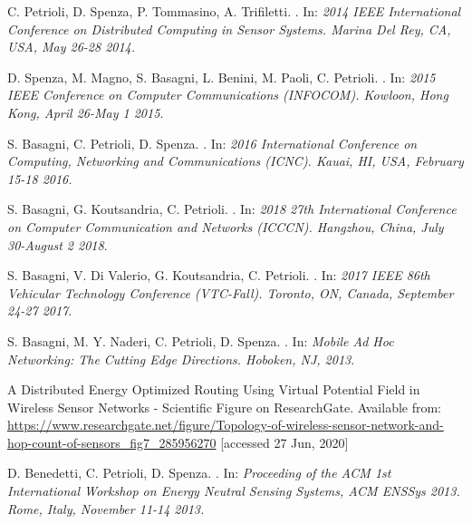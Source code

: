 \documentclass[binding=0.6cm,TFA]{sapthesis}
\begin{document}
\begin{thebibliography}{9}

    C. Petrioli, D. Spenza, P. Tommasino, A. Trifiletti.
    .
    In: \textit{2014 IEEE International Conference on Distributed Computing in Sensor Systems. Marina Del Rey, CA, USA, May 26-28 2014.}

    D. Spenza, M. Magno, S. Basagni, L. Benini, M. Paoli, C. Petrioli.
    .
    In: \textit{2015 IEEE Conference on Computer Communications (INFOCOM). Kowloon, Hong Kong, April 26-May 1 2015.}

    S. Basagni, C. Petrioli, D. Spenza.
    .
    In: \textit{2016 International Conference on Computing, Networking and Communications (ICNC). Kauai, HI, USA, February 15-18 2016.}

    S. Basagni, G. Koutsandria, C. Petrioli.
    .
    In: \textit{2018 27th International Conference on Computer Communication and Networks (ICCCN). Hangzhou, China, July 30-August 2 2018}.

    S. Basagni, V. Di Valerio, G. Koutsandria, C. Petrioli.
    .
    In: \textit{2017 IEEE 86th Vehicular Technology Conference (VTC-Fall). Toronto, ON, Canada, September 24-27 2017}.

    S. Basagni, M. Y. Naderi, C. Petrioli, D. Spenza.
    .
    In: \textit{Mobile Ad Hoc Networking: The Cutting Edge Directions. Hoboken, NJ, 2013}.

    \newpage        %

    A Distributed Energy Optimized Routing Using Virtual Potential Field in Wireless Sensor Networks - Scientific Figure on ResearchGate.
    Available from: \url{https://www.researchgate.net/figure/Topology-of-wireless-sensor-network-and-hop-count-of-sensors_fig7_285956270} [accessed 27 Jun, 2020]

    D. Benedetti, C. Petrioli, D. Spenza.
    .
    In: \textit{Proceeding of the ACM 1st International Workshop on Energy Neutral Sensing Systems, ACM ENSSys 2013. Rome, Italy, November 11-14 2013.}

\end{thebibliography}
\end{document}
